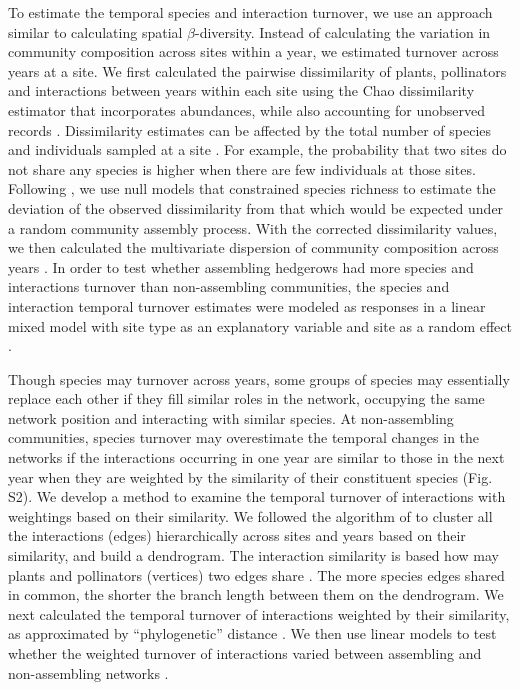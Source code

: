 \documentclass[12pt]{article}
\begin{document}
To estimate the temporal species and interaction turnover, we use an
approach similar to calculating spatial $\beta$-diversity. Instead of
calculating the variation in community composition across sites within
a year, we estimated turnover across years at a site. We first
calculated the pairwise dissimilarity of plants, pollinators and
interactions between years within each site using the Chao
dissimilarity estimator that incorporates abundances, while also
accounting for unobserved records \citep{chao-2005-148}. Dissimilarity
estimates can be affected by the total number of species and
individuals sampled at a site \citep[e.g.,][]{ponisio2015farm}. For
example, the probability that two sites do not share any species is
higher when there are few individuals at those sites. Following
\cite{ponisio2015farm}, we use null models that constrained species
richness to estimate the deviation of the observed dissimilarity from
that which would be expected under a random community assembly
process. With the corrected dissimilarity values, we then calculated
the multivariate dispersion of community composition across years
\citep{anderson-2011-19}. In order to test whether assembling
hedgerows had more species and interactions turnover than
non-assembling communities, the species and interaction temporal
turnover estimates were modeled as responses in a linear mixed model
with site type as an explanatory variable and site as a random effect
\citep{lme4, lmetest}.

Though species may turnover across years, some groups of species may
essentially replace each other if they fill similar roles in the
network, occupying the same network position and interacting with
similar species. At non-assembling communities, species turnover may
overestimate the temporal changes in the networks if the interactions
occurring in one year are similar to those in the next year when they
are weighted by the similarity of their constituent species
(Fig.~ S2). We develop a method to examine the temporal
turnover of interactions with weightings based on their similarity. We
followed the algorithm of \cite{ahn2010link} to cluster all the
interactions (edges) hierarchically across sites and years based on
their similarity, and build a dendrogram. The interaction similarity
is based how may plants and pollinators (vertices) two edges share
\citep{ahn2010link, kalinka2011linkcomm}. The more species edges
shared in common, the shorter the branch length between them on the
dendrogram.  We next calculated the temporal turnover of interactions
weighted by their similarity, as approximated by ``phylogenetic''
distance \citep{graham2008phylogenetic, picante-2010-1463}. We then
use linear models to test whether the weighted turnover of
interactions varied between assembling and non-assembling networks
\citep{lme4, lmetest}.
\end{document}
